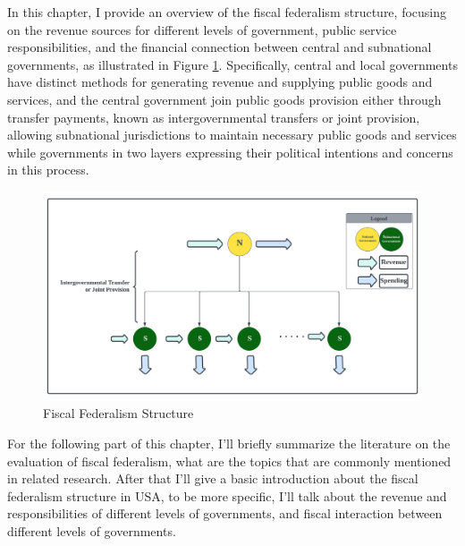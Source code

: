 In this chapter, I provide an overview of the fiscal federalism structure, focusing on the revenue sources for different levels of government, public service responsibilities, and the financial connection between central and subnational governments, as illustrated in Figure \ref*{Figure 1.1}. Specifically, central and local governments have distinct methods for generating revenue and supplying public goods and services, and the central government join public goods provision either through transfer payments, known as intergovernmental transfers or joint provision, allowing subnational jurisdictions to maintain necessary public goods and services while governments in two layers expressing their political intentions and concerns in this process.

\begin{figure}[H]
    \centering
    \includegraphics[scale=0.6]{Chapter-1/Figures/fiscal federalism.jpeg}
    \caption[Fiscal Federalism Structure]{Fiscal Federalism Structure
        \texttt{} }
    \label{Figure 1.1}
\end{figure}

For the following part of this chapter, I'll briefly summarize the literature on the evaluation of fiscal federalism, what are the topics that are commonly mentioned in related research.  After that I'll give a basic introduction about the fiscal federalism structure in USA, to be more specific, I'll talk about the revenue and responsibilities of different levels of governments, and fiscal interaction between different levels of governments.


